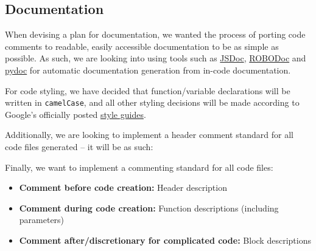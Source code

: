 \subsection{Documentation}

When devising a plan for documentation, we wanted the process of porting code comments to readable, easily accessible documentation to be as simple as possible. As such, we are looking into using tools such as \href{https://jsdoc.app/index.html}{JSDoc}, \href{https://rfsber.home.xs4all.nl/Robo/}{ROBODoc} and \href{https://docs.python.org/3/library/pydoc.html}{pydoc} for automatic documentation generation from in-code documentation.

For code styling, we have decided that function/variable declarations will be written in \verb|camelCase|, and all other styling decisions will be made according to Google's officially posted \href{https://google.github.io/styleguide/}{style guides}.

\medskip

Additionally, we are looking to implement a header comment standard for all code files generated -- it will be as such:



Finally, we want to implement a commenting standard for all code files:

\medskip

\begin{itemize}[nosep]
    \item \textbf{Comment before code creation:} Header description
    \item \textbf{Comment during code creation:} Function descriptions (including parameters)
    \item \textbf{Comment after/discretionary for complicated code:} Block descriptions
\end{itemize}
